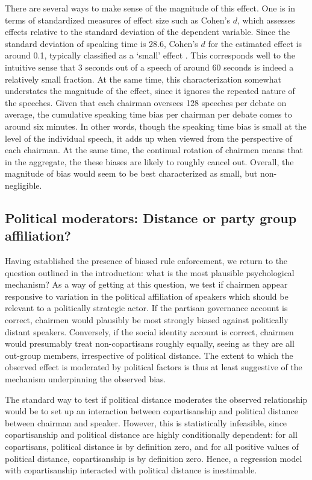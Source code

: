 \documentclass[12pt,a4paper]{article}
\begin{document}
There are several ways to make sense of the magnitude of this effect. One is in terms of standardized measures of effect size such as Cohen's $d$, which assesses effects relative to the standard deviation of the dependent variable. Since the standard deviation of speaking time is 28.6, Cohen's $d$ for the estimated effect is around 0.1, typically classified as a `small' effect \citep{Cohen1992}. This corresponds well to the intuitive sense that 3 seconds out of a speech of around 60 seconds is indeed a relatively small fraction. At the same time, this characterization somewhat understates the magnitude of the effect, since it ignores the repeated nature of the speeches. Given that each chairman oversees 128 speeches per debate on average, the cumulative speaking time bias per chairman per debate comes to around six minutes. In other words, though the speaking time bias is small at the level of the individual speech, it adds up when viewed from the perspective of each chairman. At the same time, the continual rotation of chairmen means that in the aggregate, the these biases are likely to roughly cancel out. Overall, the magnitude of bias would seem to be best characterized as small, but non-negligible.

\subsection{Political moderators: Distance or party group affiliation? }\label{polmod}

Having established the presence of biased rule enforcement, we return to the question outlined in the introduction: what is the most plausible psychological mechanism? As a way of getting at this question, we test if chairmen appear responsive to variation in the political affiliation of speakers which should be relevant to a politically strategic actor. If the partisan governance account is correct, chairmen would plausibly be most strongly biased against politically distant speakers. Conversely, if the social identity account is correct, chairmen would presumably treat non-copartisans roughly equally, seeing as they are all out-group members, irrespective of political distance. The extent to which the observed effect is moderated by political factors is thus at least suggestive of the mechanism underpinning the observed bias.

The standard way to test if political distance moderates the observed relationship would be to set up an interaction between copartisanship and political distance between chairman and speaker. However, this is statistically infeasible, since copartisanship and political distance are highly conditionally dependent: for all copartisans, political distance is by definition zero, and for all positive values of political distance, copartisanship is by definition zero. Hence, a regression model with copartisanship interacted with political distance is inestimable.
\end{document}
